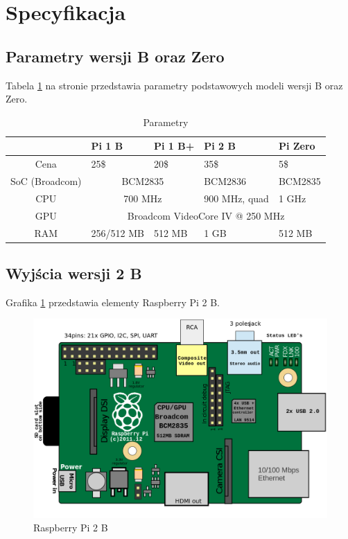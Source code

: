 \documentclass[titlepage]{article}
\begin{document}
\newpage



\section{Specyfikacja}
\subsection{Parametry wersji B oraz Zero}
Tabela \ref{table:parametry} na stronie \pageref{table:parametry} przedstawia parametry podstawowych modeli wersji B oraz Zero.

\begin{table}[!htb]
\begin{center}
\begin{tabular}{|c||l|l|l|l|}
\hline  & Pi 1 B & Pi 1 B+ & Pi 2 B & Pi Zero \\ \hline \hline
Cena & 25\$ & 20\$ & 35\$ & 5\$ \\ \hline
SoC (Broadcom) & \multicolumn{2}{c|}{BCM2835} & BCM2836 & BCM2835 \\ \hline
CPU & \multicolumn{2}{c|}{700 MHz} & 900 MHz, quad & 1 GHz\\ \hline
GPU & \multicolumn{4}{c|}{Broadcom VideoCore IV @ 250 MHz}  \\ \hline
RAM & 256/512 MB & 512 MB & 1 GB & 512 MB \\ \hline
\end{tabular}
\caption{Parametry}
\label{table:parametry}
\end{center}
\end{table}

\subsection{Wyjścia wersji 2 B}
Grafika \ref{pic:rpi2b} przedstawia elementy Raspberry Pi 2 B.\cite{wiki}

\begin{figure}[!htb]
	\includegraphics[scale=0.25]{pi2b_schema.png}
	\caption{Raspberry Pi 2 B}
	\label{pic:rpi2b}
\end{figure}
\end{document}
